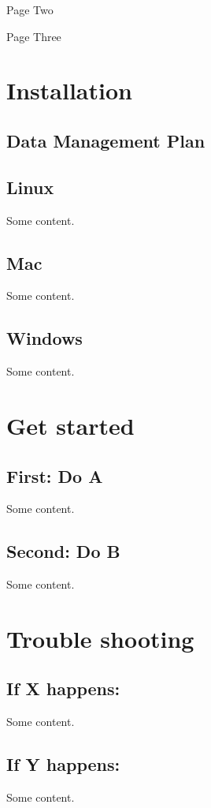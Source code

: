 \documentclass{article}
\begin{document}
\hypertarget{pagetwo}{Page Two}
\clearpage
\hypertarget{pagethree}{Page Three}

\clearpage
\section*{Installation}\label{install}

\subsection*{Data Management Plan}\label{dmp}

\subsection*{Linux}\label{linux}
Some content.

\subsection*{Mac}\label{mac}
Some content.

\subsection*{Windows}\label{win}
Some content.
\clearpage
\section*{Get started}\label{start}
\subsection*{First: Do A}\label{caseA}
Some content.

\subsection*{Second: Do B}\label{caseB}
 Some content.
\clearpage
\section*{Trouble shooting}\label{trbl-shoot}
\subsection*{If X happens:}\label{caseX}
Some content.

\subsection*{If Y happens:}\label{caseY}
 Some content.
\end{document}
